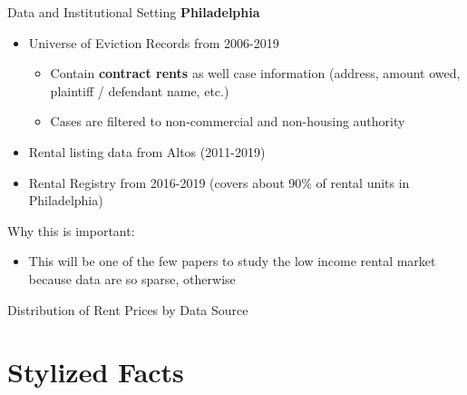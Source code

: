 \documentclass[10pt, xcolor=dvipsnames]{beamer}
\begin{document}
\begin{frame}{Data and Institutional Setting}
\textbf{Philadelphia}
    \begin{itemize}
        \item Universe of Eviction Records from 2006-2019
        \begin{itemize}
            \item Contain \textbf{contract rents} as well case information (address, amount owed, plaintiff / defendant name, etc.)
            \item Cases are filtered to non-commercial and non-housing authority
        \end{itemize}
        \item Rental listing data from Altos (2011-2019)
        \item Rental Registry from 2016-2019 (covers about 90\% of rental units in Philadelphia)
    \end{itemize}
    \pause
    Why this is important:\\
    \begin{itemize}
        \item This will be one of the few papers to study the low income rental market because data are so sparse, otherwise 
    \end{itemize}
\end{frame}

\begin{frame}{Distribution of Rent Prices by Data Source}
    
\end{frame}




\section{Stylized Facts}
\end{document}
